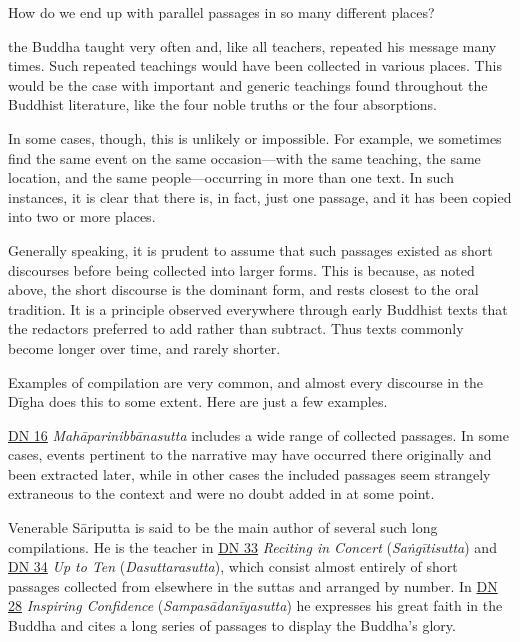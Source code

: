 \documentclass[12pt,openany]{book}%
\begin{document}
How do we end up with parallel passages in so many different places?

 the Buddha taught very often and, like all teachers, repeated his message many times. Such repeated teachings would have been collected in various places. This would be the case with important and generic teachings found throughout the Buddhist literature, like the four noble truths or the four absorptions.

In some cases, though, this is unlikely or impossible. For example, we sometimes find the same event on the same occasion—with the same teaching, the same location, and the same people—occurring in more than one text. In such instances, it is clear that there is, in fact, just one passage, and it has been copied into two or more places.

Generally speaking, it is prudent to assume that such passages existed as short discourses before being collected into larger forms. This is because, as noted above, the short discourse is the dominant form, and rests closest to the oral tradition. It is a principle observed everywhere through early Buddhist texts that the redactors preferred to add rather than subtract. Thus texts commonly become longer over time, and rarely shorter.

Examples of compilation are very common, and almost every discourse in the \textsanskrit{Dīgha} does this to some extent. Here are just a few examples.

\href{https://suttacentral.net/dn16}{DN 16} \textit{\textsanskrit{Mahāparinibbānasutta}} includes a wide range of collected passages. In some cases, events pertinent to the narrative may have occurred there originally and been extracted later, while in other cases the included passages seem strangely extraneous to the context and were no doubt added in at some point.

Venerable \textsanskrit{Sāriputta} is said to be the main author of several such long compilations. He is the teacher in \href{https://suttacentral.net/dn33}{DN 33} \textit{Reciting in Concert} (\textit{\textsanskrit{Saṅgītisutta}}) and \href{https://suttacentral.net/dn34}{DN 34} \textit{Up to Ten} (\textit{Dasuttarasutta}), which consist almost entirely of short passages collected from elsewhere in the suttas and arranged by number. In \href{https://suttacentral.net/dn28}{DN 28} \textit{Inspiring Confidence} (\textit{\textsanskrit{Sampasādanīyasutta}}) he expresses his great faith in the Buddha and cites a long series of passages to display the Buddha’s glory.
\end{document}
